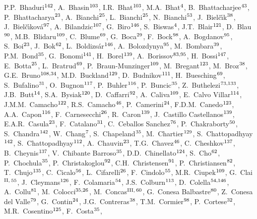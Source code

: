 \begin{flushleft}
P.P.~Bhaduri$^{\rm 142}$, 
A.~Bhasin$^{\rm 103}$, 
I.R.~Bhat$^{\rm 103}$, 
M.A.~Bhat$^{\rm 4}$, 
B.~Bhattacharjee$^{\rm 43}$, 
P.~Bhattacharya$^{\rm 23}$, 
A.~Bianchi$^{\rm 25}$, 
L.~Bianchi$^{\rm 25}$, 
N.~Bianchi$^{\rm 53}$, 
J.~Biel\v{c}\'{\i}k$^{\rm 38}$, 
J.~Biel\v{c}\'{\i}kov\'{a}$^{\rm 97}$, 
A.~Bilandzic$^{\rm 107}$, 
G.~Biro$^{\rm 146}$, 
S.~Biswas$^{\rm 4}$, 
J.T.~Blair$^{\rm 121}$, 
D.~Blau$^{\rm 90}$, 
M.B.~Blidaru$^{\rm 109}$, 
C.~Blume$^{\rm 69}$, 
G.~Boca$^{\rm 29}$, 
F.~Bock$^{\rm 98}$, 
A.~Bogdanov$^{\rm 95}$, 
S.~Boi$^{\rm 23}$, 
J.~Bok$^{\rm 62}$, 
L.~Boldizs\'{a}r$^{\rm 146}$, 
A.~Bolozdynya$^{\rm 95}$, 
M.~Bombara$^{\rm 39}$, 
P.M.~Bond$^{\rm 35}$, 
G.~Bonomi$^{\rm 141}$, 
H.~Borel$^{\rm 139}$, 
A.~Borissov$^{\rm 83,95}$, 
H.~Bossi$^{\rm 147}$, 
E.~Botta$^{\rm 25}$, 
L.~Bratrud$^{\rm 69}$, 
P.~Braun-Munzinger$^{\rm 109}$, 
M.~Bregant$^{\rm 123}$, 
M.~Broz$^{\rm 38}$, 
G.E.~Bruno$^{\rm 108,34}$, 
M.D.~Buckland$^{\rm 129}$, 
D.~Budnikov$^{\rm 111}$, 
H.~Buesching$^{\rm 69}$, 
S.~Bufalino$^{\rm 31}$, 
O.~Bugnon$^{\rm 117}$, 
P.~Buhler$^{\rm 116}$, 
P.~Buncic$^{\rm 35}$, 
Z.~Buthelezi$^{\rm 73,133}$, 
J.B.~Butt$^{\rm 14}$, 
S.A.~Bysiak$^{\rm 120}$, 
D.~Caffarri$^{\rm 92}$, 
A.~Caliva$^{\rm 109}$, 
E.~Calvo Villar$^{\rm 114}$, 
J.M.M.~Camacho$^{\rm 122}$, 
R.S.~Camacho$^{\rm 46}$, 
P.~Camerini$^{\rm 24}$, 
F.D.M.~Canedo$^{\rm 123}$, 
A.A.~Capon$^{\rm 116}$, 
F.~Carnesecchi$^{\rm 26}$, 
R.~Caron$^{\rm 139}$, 
J.~Castillo Castellanos$^{\rm 139}$, 
E.A.R.~Casula$^{\rm 23}$, 
F.~Catalano$^{\rm 31}$, 
C.~Ceballos Sanchez$^{\rm 76}$, 
P.~Chakraborty$^{\rm 50}$, 
S.~Chandra$^{\rm 142}$, 
W.~Chang$^{\rm 7}$, 
S.~Chapeland$^{\rm 35}$, 
M.~Chartier$^{\rm 129}$, 
S.~Chattopadhyay$^{\rm 142}$, 
S.~Chattopadhyay$^{\rm 112}$, 
A.~Chauvin$^{\rm 23}$, 
T.G.~Chavez$^{\rm 46}$, 
C.~Cheshkov$^{\rm 137}$, 
B.~Cheynis$^{\rm 137}$, 
V.~Chibante Barroso$^{\rm 35}$, 
D.D.~Chinellato$^{\rm 124}$, 
S.~Cho$^{\rm 62}$, 
P.~Chochula$^{\rm 35}$, 
P.~Christakoglou$^{\rm 92}$, 
C.H.~Christensen$^{\rm 91}$, 
P.~Christiansen$^{\rm 82}$, 
T.~Chujo$^{\rm 135}$, 
C.~Cicalo$^{\rm 56}$, 
L.~Cifarelli$^{\rm 26}$, 
F.~Cindolo$^{\rm 55}$, 
M.R.~Ciupek$^{\rm 109}$, 
G.~Clai$^{\rm II,}$$^{\rm 55}$, 
J.~Cleymans$^{\rm 126}$, 
F.~Colamaria$^{\rm 54}$, 
J.S.~Colburn$^{\rm 113}$, 
D.~Colella$^{\rm 54,146}$, 
A.~Collu$^{\rm 81}$, 
M.~Colocci$^{\rm 35,26}$, 
M.~Concas$^{\rm III,}$$^{\rm 60}$, 
G.~Conesa Balbastre$^{\rm 80}$, 
Z.~Conesa del Valle$^{\rm 79}$, 
G.~Contin$^{\rm 24}$, 
J.G.~Contreras$^{\rm 38}$, 
T.M.~Cormier$^{\rm 98}$, 
P.~Cortese$^{\rm 32}$, 
M.R.~Cosentino$^{\rm 125}$, 
F.~Costa$^{\rm 35}$, 

\end{flushleft}
